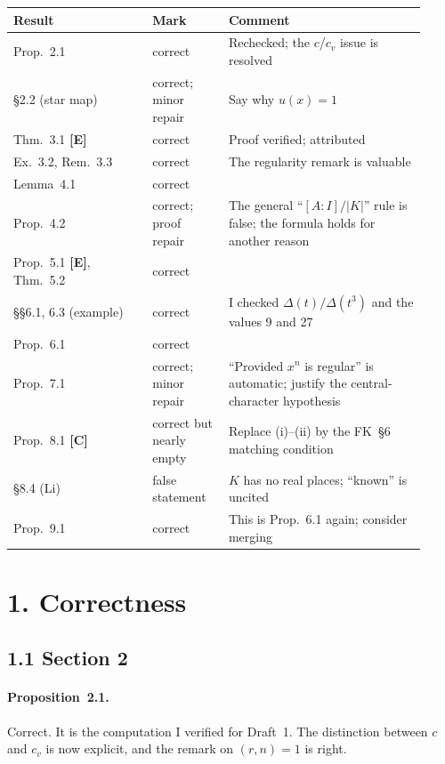 \documentclass[11pt]{article}
\begin{document}
\begin{center}\small
\begin{tabular}{@{}p{0.31\linewidth}p{0.17\linewidth}p{0.44\linewidth}@{}}
\toprule
Result & Mark & Comment\\\midrule
Prop.~2.1 & correct & Rechecked; the $c$/$c_v$ issue is resolved\\
\S2.2 (star map) & correct; minor repair & Say why $u(x)=1$\\
Thm.~3.1 \textbf{[E]} & correct & Proof verified; attributed\\
Ex.~3.2, Rem.~3.3 & correct & The regularity remark is valuable\\
Lemma~4.1 & correct & \\
Prop.~4.2 & correct; proof repair & The general ``$[A:I]/|K|$'' rule is false; the formula holds for another reason\\
Prop.~5.1 \textbf{[E]}, Thm.~5.2 & correct & \\
\S\S6.1, 6.3 (example) & correct & I checked $\Delta(t)/\Delta(t^3)$ and the values 9 and 27\\
Prop.~6.1 & correct & \\
Prop.~7.1 & correct; minor repair & ``Provided $x^n$ is regular'' is automatic; justify the central-character hypothesis\\
Prop.~8.1 \textbf{[C]} & correct but nearly empty & Replace (i)--(ii) by the FK~\S6 matching condition\\
\S8.4 (Li) & false statement & $K$ has no real places; ``known'' is uncited\\
Prop.~9.1 & correct & This is Prop.~6.1 again; consider merging\\
\bottomrule
\end{tabular}
\end{center}

\section*{1. Correctness}

\subsection*{1.1 Section 2}
\paragraph{Proposition~2.1.} Correct. It is the computation I verified for
Draft~1. The distinction between $c$ and $c_v$ is now explicit, and the
remark on $(r,n)=1$ is right.
\end{document}

